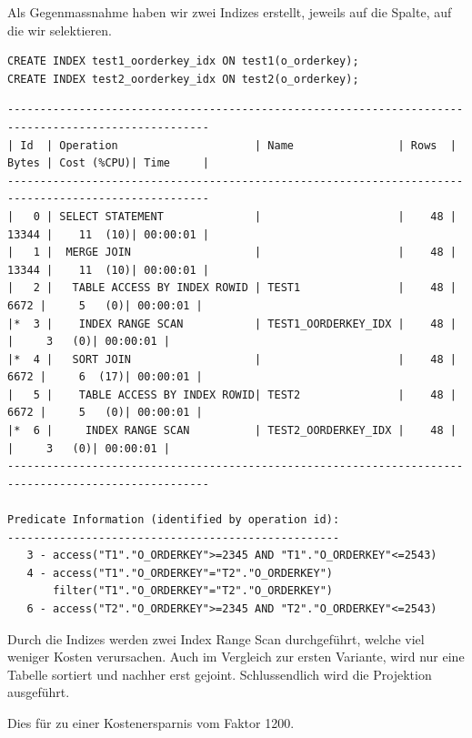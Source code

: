 \documentclass[10pt]{article}
\begin{document}
Als Gegenmassnahme haben wir zwei Indizes erstellt, jeweils auf die Spalte, auf 
die wir selektieren. 
\begin{lstlisting}[style=sql]
CREATE INDEX test1_oorderkey_idx ON test1(o_orderkey);
CREATE INDEX test2_oorderkey_idx ON test2(o_orderkey);
\end{lstlisting}
\begin{lstlisting}[style=queryexecutionplanSmall]
-----------------------------------------------------------------------------------------------------
| Id  | Operation                     | Name                | Rows  | Bytes | Cost (%CPU)| Time     |
-----------------------------------------------------------------------------------------------------
|   0 | SELECT STATEMENT              |                     |    48 | 13344 |    11  (10)| 00:00:01 |
|   1 |  MERGE JOIN                   |                     |    48 | 13344 |    11  (10)| 00:00:01 |
|   2 |   TABLE ACCESS BY INDEX ROWID | TEST1               |    48 |  6672 |     5   (0)| 00:00:01 |
|*  3 |    INDEX RANGE SCAN           | TEST1_OORDERKEY_IDX |    48 |       |     3   (0)| 00:00:01 |
|*  4 |   SORT JOIN                   |                     |    48 |  6672 |     6  (17)| 00:00:01 |
|   5 |    TABLE ACCESS BY INDEX ROWID| TEST2               |    48 |  6672 |     5   (0)| 00:00:01 |
|*  6 |     INDEX RANGE SCAN          | TEST2_OORDERKEY_IDX |    48 |       |     3   (0)| 00:00:01 |
-----------------------------------------------------------------------------------------------------
 
Predicate Information (identified by operation id):
---------------------------------------------------
   3 - access("T1"."O_ORDERKEY">=2345 AND "T1"."O_ORDERKEY"<=2543)
   4 - access("T1"."O_ORDERKEY"="T2"."O_ORDERKEY")
       filter("T1"."O_ORDERKEY"="T2"."O_ORDERKEY")
   6 - access("T2"."O_ORDERKEY">=2345 AND "T2"."O_ORDERKEY"<=2543)
\end{lstlisting}
Durch die Indizes werden zwei Index Range Scan durchgeführt, welche viel weniger Kosten verursachen. 
Auch im Vergleich zur ersten Variante, wird nur eine Tabelle sortiert und nachher erst gejoint. 
Schlussendlich wird die Projektion ausgeführt.

Dies für zu einer Kostenersparnis vom Faktor 1200.
\end{document}
